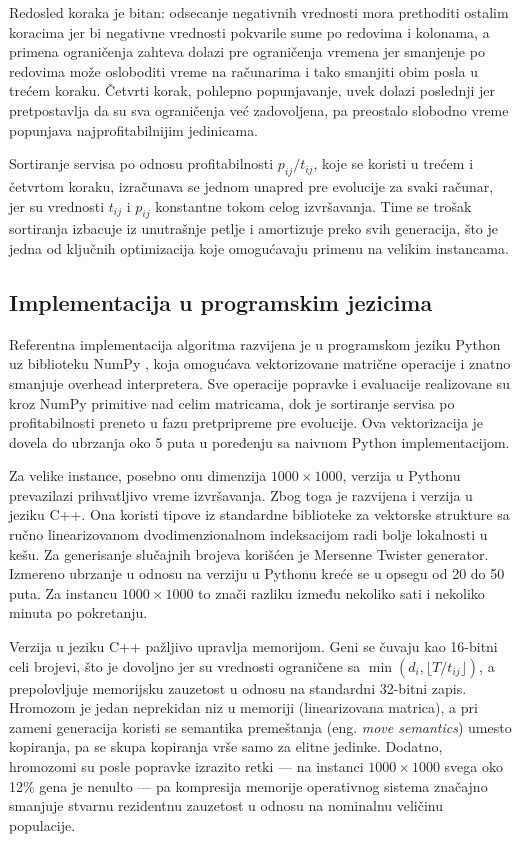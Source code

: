 \documentclass[12pt]{article}
\begin{document}
Redosled koraka je bitan: odsecanje negativnih vrednosti mora prethoditi ostalim koracima jer bi negativne vrednosti pokvarile sume po redovima i kolonama, a primena ograničenja zahteva dolazi pre ograničenja vremena jer smanjenje po redovima može osloboditi vreme na računarima i tako smanjiti obim posla u trećem koraku. Četvrti korak, pohlepno popunjavanje, uvek dolazi poslednji jer pretpostavlja da su sva ograničenja već zadovoljena, pa preostalo slobodno vreme popunjava najprofitabilnijim jedinicama.

Sortiranje servisa po odnosu profitabilnosti $p_{ij}/t_{ij}$, koje se koristi u trećem i četvrtom koraku, izračunava se jednom unapred pre evolucije za svaki računar, jer su vrednosti $t_{ij}$ i $p_{ij}$ konstantne tokom celog izvršavanja. Time se trošak sortiranja izbacuje iz unutrašnje petlje i amortizuje preko svih generacija, što je jedna od ključnih optimizacija koje omogućavaju primenu na velikim instancama.

\subsection{Implementacija u programskim jezicima}

Referentna implementacija algoritma razvijena je u programskom jeziku Python uz biblioteku NumPy \cite{NumPy}, koja omogućava vektorizovane matrične operacije i znatno smanjuje overhead interpretera. Sve operacije popravke i evaluacije realizovane su kroz NumPy primitive nad celim matricama, dok je sortiranje servisa po profitabilnosti preneto u fazu pretpripreme pre evolucije. Ova vektorizacija je dovela do ubrzanja oko 5 puta u poređenju sa naivnom Python implementacijom.

Za velike instance, posebno onu dimenzija $1000 \times 1000$, verzija u Pythonu prevazilazi prihvatljivo vreme izvršavanja. Zbog toga je razvijena i verzija u jeziku C++. Ona koristi tipove iz standardne biblioteke za vektorske strukture sa ručno linearizovanom dvodimenzionalnom indeksacijom radi bolje lokalnosti u kešu. Za generisanje slučajnih brojeva korišćen je Mersenne Twister generator. Izmereno ubrzanje u odnosu na verziju u Pythonu kreće se u opsegu od 20 do 50 puta. Za instancu $1000 \times 1000$ to znači razliku između nekoliko sati i nekoliko minuta po pokretanju.

Verzija u jeziku C++ pažljivo upravlja memorijom. Geni se čuvaju kao 16-bitni celi brojevi, što je dovoljno jer su vrednosti ograničene sa $\min(d_i, \lfloor T/t_{ij} \rfloor)$, a prepolovljuje memorijsku zauzetost u odnosu na standardni 32-bitni zapis. Hromozom je jedan neprekidan niz u memoriji (linearizovana matrica), a pri zameni generacija koristi se semantika premeštanja (eng. \textit{move semantics}) umesto kopiranja, pa se skupa kopiranja vrše samo za elitne jedinke. Dodatno, hromozomi su posle popravke izrazito retki — na instanci $1000 \times 1000$ svega oko 12\% gena je nenulto — pa kompresija memorije operativnog sistema značajno smanjuje stvarnu rezidentnu zauzetost u odnosu na nominalnu veličinu populacije.
\end{document}
